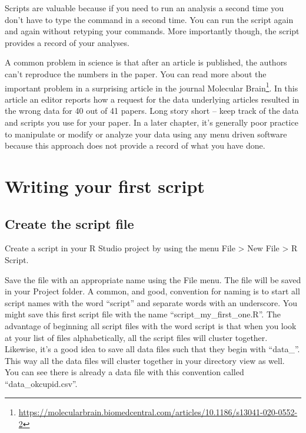 \documentclass[
]{krantz}
\renewcommand{\href}[2]{#2\footnote{\url{#1}}}
\begin{document}
Scripts are valuable because if you need to run an analysis a second time you don't have to type the command in a second time. You can run the script again and again without retyping your commands. More importantly though, the script provides a record of your analyses.

A common problem in science is that after an article is published, the authors can't reproduce the numbers in the paper. You can read more about the important problem in a surprising article in the journal \href{https://molecularbrain.biomedcentral.com/articles/10.1186/s13041-020-0552-2}{Molecular Brain}. In this article an editor reports how a request for the data underlying articles resulted in the wrong data for 40 out of 41 papers. Long story short -- keep track of the data and scripts you use for your paper. In a later chapter, it's generally poor practice to manipulate or modify or analyze your data using any menu driven software because this approach does not provide a record of what you have done.

\hypertarget{writing-your-first-script}{%
\section{Writing your first script}\label{writing-your-first-script}}

\hypertarget{create-the-script-file}{%
\subsection{Create the script file}\label{create-the-script-file}}

Create a script in your R Studio project by using the menu File \textgreater{} New File \textgreater{} R Script.

Save the file with an appropriate name using the File menu. The file will be saved in your Project folder. A common, and good, convention for naming is to start all script names with the word ``script'' and separate words with an underscore. You might save this first script file with the name ``script\_my\_first\_one.R''. The advantage of beginning all script files with the word script is that when you look at your list of files alphabetically, all the script files will cluster together. Likewise, it's a good idea to save all data files such that they begin with ``data\_''. This way all the data files will cluster together in your directory view as well. You can see there is already a data file with this convention called ``data\_okcupid.csv''.
\end{document}
